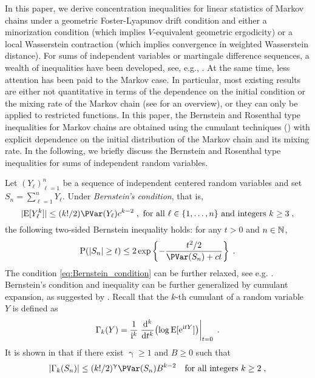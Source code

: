 In this paper, we derive concentration inequalities for linear statistics of Markov chains under a geometric Foster-Lyapunov drift condition and either a minorization condition (which implies $V$-equivalent geometric ergodicity) or a local Wasserstein contraction (which implies convergence in weighted Wasserstein distance). For sums of  independent variables or martingale difference sequences, a wealth of inequalities have been developed, see, e.g.,  \cite{bercu2015concentration}. At the same time, less attention has been paid to the Markov case. In particular, most existing results are either not quantitative in terms of the dependence on the initial condition or the mixing rate of the Markov chain (see  for an overview), or they can only be applied to restricted functions. In this paper, the Bernstein and Rosenthal type inequalities for Markov chains are obtained using the cumulant techniques (\cite{leonov:sirjaev:1959,saulis:statulevicius:1991}) with explicit dependence on the initial distribution of the Markov chain and its mixing rate. In the following, we briefly discuss the Bernstein and Rosenthal type inequalities for sums of independent random variables.
\par 
Let $(Y_\ell)_{\ell=1}^n$ be a sequence of independent centered random variables and set $S_n= \sum_{\ell=1}^n Y_{\ell}$. Under \emph{Bernstein's condition}, that is,
\begin{equation}
  \label{eq:Bernstein_condition}
  |\PE[Y_{\ell}^k]|  \leq (k!/2) \PVar(Y_{\ell}) c^{k-2}\eqsp, \text{ for all } \ell \in\{1, \ldots, n\} \text{ and integers } k \geq 3  \eqsp,
\end{equation}
the following two-sided Bernstein inequality holds: for any $t > 0$ and $n \in \mathbb{N}$,
\begin{equation}
\label{eq:Bernstein-Rio}
\PP( |S_n| \geq t) \leq 2 \exp\left\{ - \frac{t^2/2}{\PVar(S_n) + c t} \right\} \eqsp.
\end{equation}
The condition \eqref{eq:Bernstein_condition} can be further relaxed, see e.g. \cite[Chapter~2, Theorem~2.9]{bercu2015concentration}. Bernstein's condition and inequality can be further generalized by cumulant expansion, as suggested by \cite{bentkus:1980}. Recall that the $k$-th cumulant of a random variable $Y$ is defined as
\[
\Gamma_k(Y) = \frac{1}{\mathrm{i}^k} \left.\frac{\mathrm{d}^k}{\mathrm{d} t^k}\bigl(\log \mathrm{E}[\mathrm{e}^{\mathrm{i} t Y}]\bigr)\right\vert_{t=0} \;.
\]
It is shown in \cite{bentkus:1980} that if there exist $\upgamma \geq 1$ and $B \geq 0$ such that
\begin{equation}
\label{eq:bernstein-condition-cumulant}
|\Gamma_k(S_n)| \le (k!/2)^\upgamma \PVar(S_n) B^{k-2}  \quad \text{for all integers  $k \geq 2$} \eqsp,
\end{equation}
